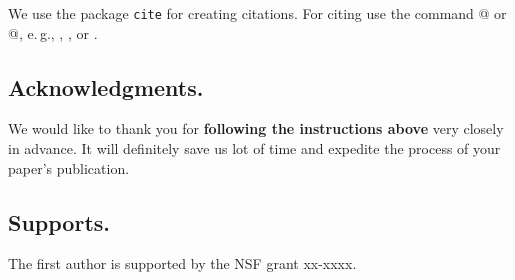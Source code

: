 \documentclass[11pt,a4paper,twoside]{article}
\begin{document}
We use the package \texttt{cite} for creating citations. For citing
use the command \verb@\cite{label}@ or
\verb@\cite[text]{label}@, e.\,g., \cite{BFL},
\cite{Hoff,Whho,Serrin,BFL,BY,A22,quas,Mitt}, or \cite[Chapter
1]{rB}.



\subsection*{Acknowledgments.} We would like to thank you for \textbf{following
the instructions above} very closely in advance. It will definitely
save us lot of time and expedite the process of your paper's
publication.


\subsection*{Supports.} The first author is supported by the NSF grant xx-xxxx.


\end{document}
